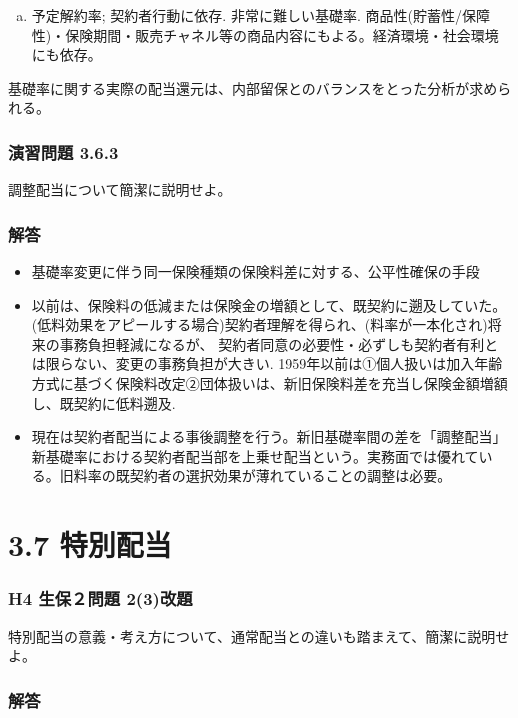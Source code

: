 \documentclass[report,gutter=10mm,fore-edge=10mm,uplatex,dvipdfmx]{jlreq}
\begin{document}
\begin{enumerate} [(1)]
\begin{enumerate}[(a)]
\begin{enumerate} [(a)]
\begin{itemize}
 \item 災害関係保険; 社会環境変化・大地震等. 将来の収支に不透明な要素が多い.利益留保の必要性高い。
 \item 疾病関係保険; 医療技術の進歩,社会保障制度の変化,モラルリスクの選択が困難.  
\end{itemize}
 \item 予定解約率;  契約者行動に依存. 非常に難しい基礎率. 商品性(貯蓄性/保障性)・保険期間・販売チャネル等の商品内容にもよる。経済環境・社会環境にも依存。
\end{enumerate}
\end{enumerate}
\end{enumerate}

基礎率に関する実際の配当還元は、内部留保とのバランスをとった分析が求められる。

\subsubsection{演習問題 3.6.3}
調整配当について簡潔に説明せよ。
\subsubsection{解答}
\begin{itemize}
 \item 基礎率変更に伴う同一保険種類の保険料差に対する、公平性確保の手段
 \item 以前は、保険料の低減または保険金の増額として、既契約に遡及していた。
(低料効果をアピールする場合)契約者理解を得られ、(料率が一本化され)将来の事務負担軽減になるが、
契約者同意の必要性・必ずしも契約者有利とは限らない、変更の事務負担が大きい. 
1959年以前は①個人扱いは加入年齢方式に基づく保険料改定②団体扱いは、新旧保険料差を充当し保険金額増額し、既契約に低料遡及.
 \item 現在は契約者配当による事後調整を行う。新旧基礎率間の差を「調整配当」新基礎率における契約者配当部を上乗せ配当という。実務面では優れている。旧料率の既契約者の選択効果が薄れていることの調整は必要。
\end{itemize}
\section{3.7 特別配当}
\subsubsection{H4 生保２問題 2(3)改題}
特別配当の意義・考え方について、通常配当との違いも踏まえて、簡潔に説明せよ。
\subsubsection{解答}
\end{document}

